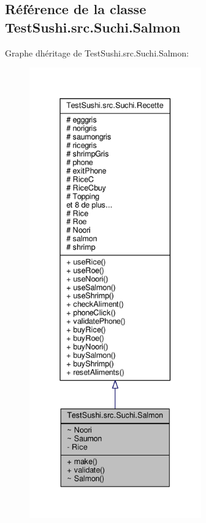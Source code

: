 \hypertarget{classTestSushi_1_1src_1_1Suchi_1_1Salmon}{}\subsection{Référence de la classe Test\+Sushi.\+src.\+Suchi.\+Salmon}
\label{classTestSushi_1_1src_1_1Suchi_1_1Salmon}


Graphe d\textquotesingle{}héritage de Test\+Sushi.\+src.\+Suchi.\+Salmon\+:\nopagebreak
\begin{figure}[H]
\begin{center}
\leavevmode
\includegraphics[height=550pt]{classTestSushi_1_1src_1_1Suchi_1_1Salmon__inherit__graph}
\end{center}
\end{figure}


